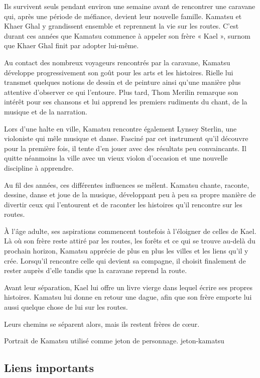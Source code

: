 Ils survivent seuls pendant environ une semaine avant de rencontrer une
caravane qui, après une période de méfiance, devient leur nouvelle famille.
Kamatsu et Khaer Ghal y grandissent ensemble et reprennent la vie sur les
routes. C'est durant ces années que Kamatsu commence à appeler son frère
« Kael », surnom que Khaer Ghal finit par adopter lui-même.

Au contact des nombreux voyageurs rencontrés par la caravane, Kamatsu
développe progressivement son goût pour les arts et les histoires. Rielle lui
transmet quelques notions de dessin et de peinture ainsi qu'une manière plus
attentive d'observer ce qui l'entoure. Plus tard, Thom Merilin remarque son
intérêt pour ses chansons et lui apprend les premiers rudiments du chant, de
la musique et de la narration.

Lors d'une halte en ville, Kamatsu rencontre également Lynsey Sterlin, une
violoniste qui mêle musique et danse. Fasciné par cet instrument qu'il
découvre pour la première fois, il tente d'en jouer avec des résultats peu
convaincants. Il quitte néanmoins la ville avec un vieux violon d'occasion et
une nouvelle discipline à apprendre.

Au fil des années, ces différentes influences se mêlent. Kamatsu chante,
raconte, dessine, danse et joue de la musique, développant peu à peu sa propre
manière de divertir ceux qui l'entourent et de raconter les histoires qu'il
rencontre sur les routes.

À l'âge adulte, ses aspirations commencent toutefois à l'éloigner de celles
de Kael. Là où son frère reste attiré par les routes, les forêts et ce qui se
trouve au-delà du prochain horizon, Kamatsu apprécie de plus en plus les
villes et les liens qu'il y crée. Lorsqu'il rencontre celle qui devient sa
compagne, il choisit finalement de rester auprès d'elle tandis que la caravane
reprend la route.

Avant leur séparation, Kael lui offre un livre vierge dans lequel écrire ses
propres histoires. Kamatsu lui donne en retour une dague, afin que son frère
emporte lui aussi quelque chose de lui sur les routes.

Leurs chemins se séparent alors, mais ils restent frères de cœur.

  {Portrait de Kamatsu utilisé comme jeton de personnage.}
  {jeton-kamatsu}

\subsection*{Liens importants}

